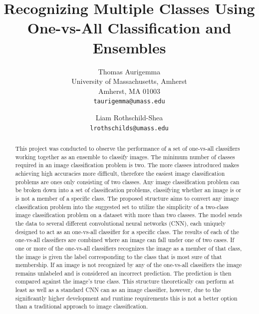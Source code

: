 \documentclass[10pt,twocolumn,letterpaper]{article}
\begin{document}
\title{Recognizing Multiple Classes Using One-vs-All Classification and Ensembles}

\author{Thomas Aurigemma\\
University of Massachusetts, Amherst\\
Amherst, MA 01003\\
{\tt\small taurigemma@umass.edu}
\and
Liam Rothschild-Shea\\
{\tt\small lrothschilds@umass.edu}
}

\maketitle

\begin{abstract}
   This project was conducted to observe the performance of a set of one-vs-all classifiers working together as an ensemble to classify images. The minimum number of classes required in an image classification problem is two. The more classes introduced makes achieving high accuracies more difficult, therefore the easiest image classification problems are ones only consisting of two classes. Any image classification problem can be broken down into a set of classification problems, classifying whether an image is or is not a member of a specific class. The proposed structure aims to convert any image classification problem into the suggested set to utilize the simplicity of a two-class image classification problem on a dataset with more than two classes. The model sends the data to several different convolutional neural networks (CNN), each uniquely designed to act as an one-vs-all classifier for a specific class. The results of each of the one-vs-all classifiers are combined where an image can fall under one of two cases. If one or more of the one-vs-all classifiers recognizes the image as a member of that class, the image is given the label corresponding to the class that is most sure of that membership. If an image is not recognized by any of the one-vs-all classifiers the image remains unlabeled and is considered an incorrect prediction. The prediction is then compared against the image’s true class. This structure theoretically can perform at least as well as a standard CNN can as an  image classifier, however, due to the significantly higher development and runtime requirements this is not a better option than a traditional approach to image classification.
\end{abstract}
\end{document}
